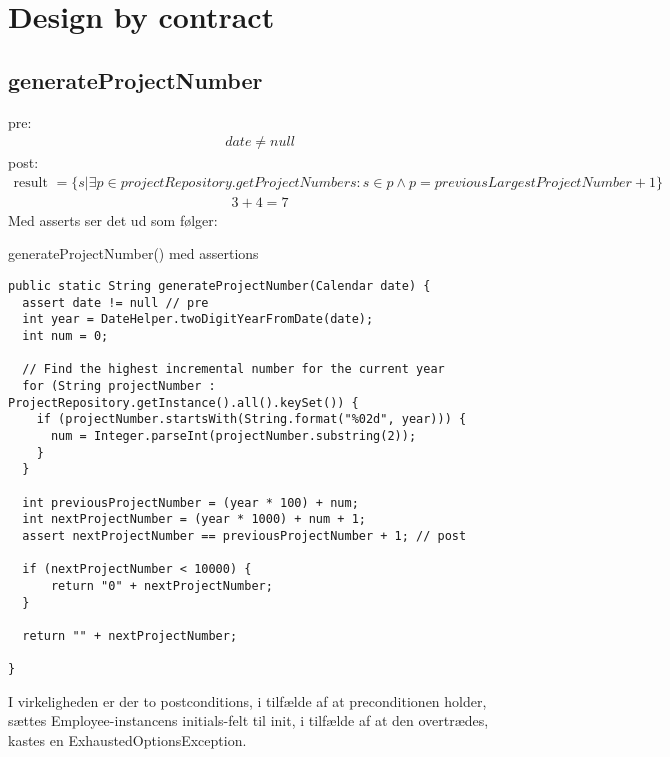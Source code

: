 \section{Design by contract}\label{chap:design_by_contract}

\subsection{generateProjectNumber} \label{sec:contract_generate_project_number}
pre: 
\begin{align}
    date \neq null
\end{align}
post:
\begin{align}
    \text{result } = \{s|\exists p \in projectRepository.getProjectNumbers : s \in p \land p = previousLargestProjectNumber + 1\}
\end{align}
\begin{align}
    3 + 4 = 7
\end{align}
\newline
\noindent
Med asserts ser det ud som følger:

\begin{listing}[H]
    \centering
    \caption{generateProjectNumber() med assertions}\label{lst:cgenerate_project_number_assertions}
    \begin{verbatim}
public static String generateProjectNumber(Calendar date) {
  assert date != null // pre
  int year = DateHelper.twoDigitYearFromDate(date);
  int num = 0;

  // Find the highest incremental number for the current year
  for (String projectNumber : ProjectRepository.getInstance().all().keySet()) {
    if (projectNumber.startsWith(String.format("%02d", year))) {
      num = Integer.parseInt(projectNumber.substring(2));
    }
  }

  int previousProjectNumber = (year * 100) + num;
  int nextProjectNumber = (year * 1000) + num + 1;
  assert nextProjectNumber == previousProjectNumber + 1; // post
  
  if (nextProjectNumber < 10000) {
      return "0" + nextProjectNumber;
  }

  return "" + nextProjectNumber;

}
    \end{verbatim}
\end{listing}
\noindent
I virkeligheden er der to postconditions, i tilfælde af at preconditionen holder, sættes Employee-instancens initials-felt til init, i tilfælde af at den overtrædes, kastes en ExhaustedOptionsException.\\[4mm]
